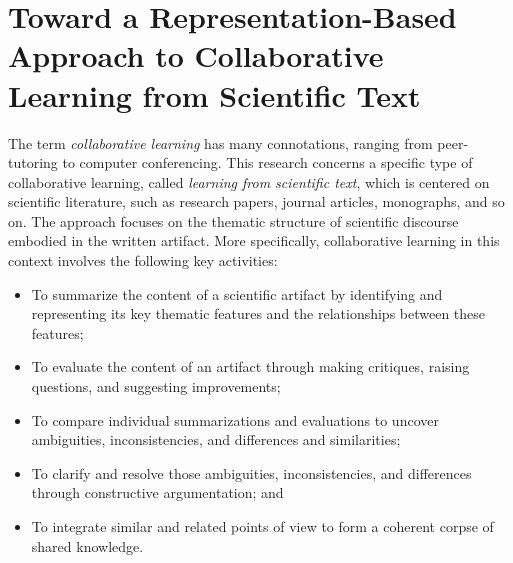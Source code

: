 

\setcounter{chapter}{1}
\chapter{Toward a Representation-Based Approach to Collaborative
Learning from Scientific Text}
\label{sec:approach}

The term {\it collaborative learning\/} has many connotations, ranging from
peer-tutoring to computer conferencing. This research concerns a specific
type of collaborative learning, called {\it learning from scientific
text\/}, which is centered on scientific literature, such as research
papers, journal articles, monographs, and so on. The approach focuses on
the thematic structure of scientific discourse embodied in the written
artifact. More specifically, collaborative learning in this context
involves the following key activities:

\begin{itemize}
\item To summarize the content of a scientific artifact by identifying
  and representing its key thematic features and the relationships
  between these features;
  
\item To evaluate the content of an artifact through making critiques,
  raising questions, and suggesting improvements;
  
\item To compare individual summarizations and evaluations to uncover
  ambiguities, inconsistencies, and differences and similarities;
  
\item To clarify and resolve those ambiguities, inconsistencies, and
  differences through constructive argumentation; and
  
\item To integrate similar and related points of view to form a coherent
  corpse of shared knowledge.
\end{itemize}

